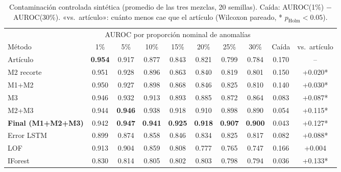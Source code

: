 \begin{table}[t]
\centering\small
\caption{Contaminación controlada sintética (promedio de las tres mezclas, 20 semillas). Caída: AUROC(1\%) $-$ AUROC(30\%). «vs.\ artículo»: cuánto menos cae que el artículo (Wilcoxon pareado, * $p_{\text{Holm}}<0.05$).}
\label{tab:contam}
\begin{tabular}{lccccccccc}
\toprule
& \multicolumn{7}{c}{AUROC por proporción nominal de anomalías} & & \\ \cmidrule(lr){2-8}
Método & 1\% & 5\% & 10\% & 15\% & 20\% & 25\% & 30\% & Caída & vs.\ artículo \\
\midrule
Artículo & \textbf{0.954} & 0.917 & 0.877 & 0.843 & 0.821 & 0.799 & 0.784 & 0.170 & -- \\
M2 recorte & 0.951 & 0.928 & 0.896 & 0.863 & 0.840 & 0.819 & 0.801 & 0.150 & +0.020* \\
M1+M2 & 0.950 & 0.927 & 0.898 & 0.868 & 0.846 & 0.825 & 0.810 & 0.140 & +0.030* \\
M3 & 0.946 & 0.932 & 0.913 & 0.893 & 0.885 & 0.872 & 0.864 & 0.083 & +0.087* \\
M2+M3 & 0.944 & \textbf{0.946} & 0.938 & 0.918 & 0.910 & 0.898 & 0.890 & 0.054 & +0.115* \\
\textbf{Final (M1+M2+M3)} & 0.942 & \textbf{0.947} & \textbf{0.941} & \textbf{0.925} & \textbf{0.918} & \textbf{0.907} & \textbf{0.900} & 0.043 & +0.127* \\
Error LSTM & 0.899 & 0.874 & 0.858 & 0.846 & 0.834 & 0.825 & 0.817 & 0.082 & +0.088* \\
LOF & 0.913 & 0.904 & 0.859 & 0.808 & 0.777 & 0.765 & 0.747 & 0.166 & +0.004 \\
IForest & 0.830 & 0.814 & 0.805 & 0.802 & 0.803 & 0.798 & 0.794 & 0.036 & +0.133* \\
\bottomrule
\end{tabular}
\end{table}
